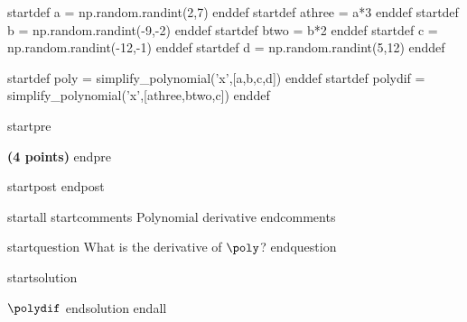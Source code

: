 startdef a = np.random.randint(2,7) enddef
startdef athree = a*3 enddef
startdef b = np.random.randint(-9,-2) enddef
startdef btwo = b*2 enddef
startdef c = np.random.randint(-12,-1) enddef
startdef d = np.random.randint(5,12) enddef

startdef poly = simplify_polynomial('x',[a,b,c,d]) enddef
startdef polydif = simplify_polynomial('x',[athree,btwo,c]) enddef


startpre \item {\bf (4 points)} endpre

startpost
\vfill 
endpost



startall
startcomments 
Polynomial derivative
endcomments

startquestion What is the derivative of $\poly$?
endquestion

startsolution
\item $\polydif$
endsolution
endall




